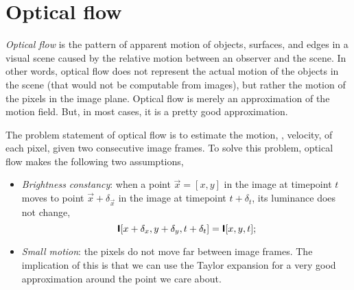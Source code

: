 \section{Optical flow}

\textit{Optical flow} is the pattern of apparent motion of objects, surfaces,
and edges in a visual scene caused by the relative motion between an observer
and the scene. In other words, optical flow does
not represent the actual motion of the objects in the scene (that would not be
computable from images), but rather the motion of the pixels in the image
plane. Optical flow is merely an approximation of the motion field. But, in
most cases, it is a pretty good approximation.

The problem statement of optical flow is to estimate the motion, \ie, velocity,
of each pixel, given two consecutive image frames. To solve this problem,
optical flow makes the following two assumptions,
\begin{itemize}
    \item \textit{Brightness constancy}: when a point $\vec{x}=[x, y]$ in the
          image at timepoint $t$ moves to point $\vec{x}+\delta_{\vec{x}}$ in the
          image at timepoint $t+\delta_t$, its luminance does not change, \[
              \bm{\mathsf{I}}[x+\delta_x,y+\delta_y,t+\delta_t] = \bm{\mathsf{I}}[x,y,t];
          \]
    \item \textit{Small motion}: the pixels do not move far between image frames.
          The implication of this is that we can use the Taylor expansion for a very
          good approximation around the point we care about.
\end{itemize}

